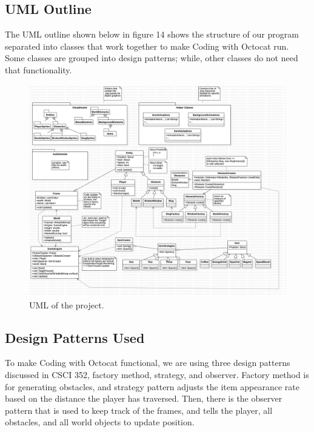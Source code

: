 \documentclass[10pt,conference,onecolumn,compsoc]{IEEEtran}
\begin{document}
\subsection{UML Outline}
The UML outline shown below in figure 14 shows the structure of our program separated into classes that work together to make Coding with Octocat run. Some classes are grouped into design patterns; while, other classes do not need that functionality.

\clearpage

\begin{figure}[!ht]
\centering
\includegraphics[scale=.18]{UML.jpg}
\caption{UML of the project.}
\end{figure}

\subsection{Design Patterns Used}
To make Coding with Octocat functional, we are using three design patterns discussed in CSCI 352, factory method, strategy, and observer. Factory method is for generating obstacles, and strategy pattern adjusts the item appearance rate based on the distance the player has traversed. Then, there is the observer pattern that is used to keep track of the frames, and tells the player, all obstacles, and all world objects to update position.

\end{document}
